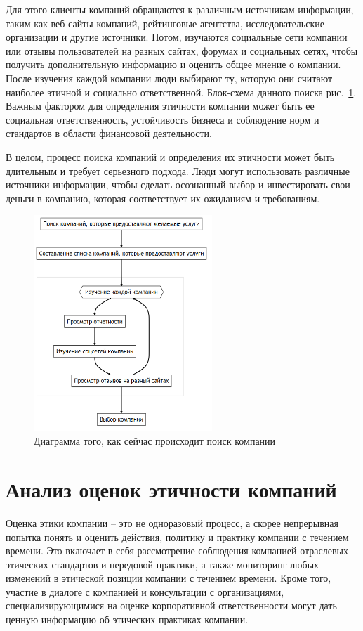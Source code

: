 \documentclass[PI, VKR]{HSEUniversity}
\begin{document}
Для этого клиенты компаний обращаются к различным источникам информации, таким как веб-сайты компаний, рейтинговые агентства, исследовательские организации и другие источники. Потом, изучаются социальные сети компании или отзывы пользователей на разных сайтах, форумах и социальных сетях, чтобы получить дополнительную информацию и оценить общее мнение о компании. После изучения каждой компании люди выбирают ту, которую они считают наиболее этичной и социально ответственной. Блок-схема данного поиска рис.~\ref{fig:as_is}. Важным фактором для определения этичности компании может быть ее социальная ответственность, устойчивость бизнеса и соблюдение норм и стандартов в области финансовой деятельности.

В целом, процесс поиска компаний и определения их этичности может быть длительным и требует серьезного подхода. Люди могут использовать различные источники информации, чтобы сделать осознанный выбор и инвестировать свои деньги в компанию, которая соответствует их ожиданиям и требованиям.
\begin{figure}[h]
\centering
\includegraphics[width=0.6\textwidth]{img/mermaid/as_is.png}
\caption{\label{fig:as_is}Диаграмма того, как сейчас происходит поиск компании}
\end{figure}

\section{Анализ оценок этичности компаний}
\label{sec:org0aa1f7b}
Оценка этики компании -- это не одноразовый процесс, а скорее непрерывная попытка понять и оценить действия, политику и практику компании с течением времени. Это включает в себя рассмотрение соблюдения компанией отраслевых этических стандартов и передовой практики, а также мониторинг любых изменений в этической позиции компании с течением времени. Кроме того, участие в диалоге с компанией и консультации с организациями, специализирующимися на оценке корпоративной ответственности могут дать ценную информацию об этических практиках компании.
\end{document}

